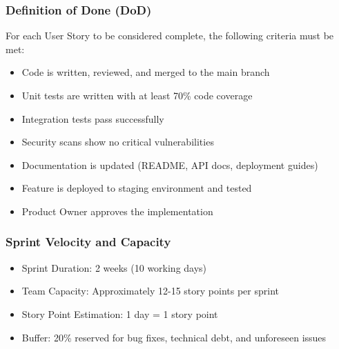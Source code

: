 \subsubsection{Definition of Done (DoD)}
For each User Story to be considered complete, the following criteria must be met:
\begin{itemize}
    \item Code is written, reviewed, and merged to the main branch
    \item Unit tests are written with at least 70\% code coverage
    \item Integration tests pass successfully
    \item Security scans show no critical vulnerabilities
    \item Documentation is updated (README, API docs, deployment guides)
    \item Feature is deployed to staging environment and tested
    \item Product Owner approves the implementation
\end{itemize}

\subsubsection{Sprint Velocity and Capacity}
\begin{itemize}
    \item Sprint Duration: 2 weeks (10 working days)
    \item Team Capacity: Approximately 12-15 story points per sprint
    \item Story Point Estimation: 1 day = 1 story point
    \item Buffer: 20\% reserved for bug fixes, technical debt, and unforeseen issues
\end{itemize}


